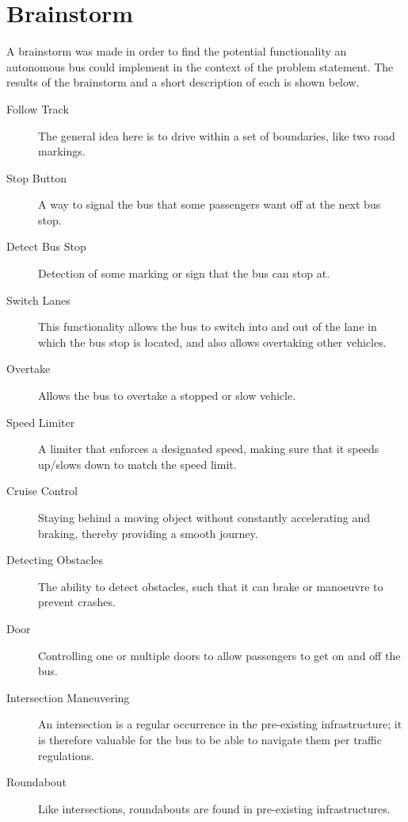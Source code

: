 \section{Brainstorm}

A brainstorm was made in order to find the potential functionality an autonomous bus could implement in the context of the problem statement. The results of the brainstorm and a short description of each is shown below. 

\begin{description}
\item [Follow Track]
The general idea here is to drive within a set of boundaries, like two road markings.

\item[Stop Button]
A way to signal the bus that some passengers want off at the next bus stop.

\item[Detect Bus Stop]
Detection of some marking or sign that the bus can stop at.

\item[Switch Lanes]
This functionality allows the bus to switch into and out of the lane in which the bus stop is located, and also allows overtaking other vehicles. 

\item[Overtake]
Allows the bus to overtake a stopped or slow vehicle. 

\item[Speed Limiter]
A limiter that enforces a designated speed, making sure that it speeds up/slows down to match the speed limit.

\item[Cruise Control]
Staying behind a moving object without constantly accelerating and braking, thereby providing a smooth journey.

\item[Detecting Obstacles]
The ability to detect obstacles, such that it can brake or manoeuvre to prevent crashes.

\item[Door]
Controlling one or multiple doors to allow passengers to get on and off the bus.

\item[Intersection Maneuvering]
An intersection is a regular occurrence in the pre-existing infrastructure; it is therefore valuable for the bus to be able to navigate them per traffic regulations.

\item[Roundabout]
Like intersections, roundabouts are found in pre-existing infrastructures.


\end{description}
